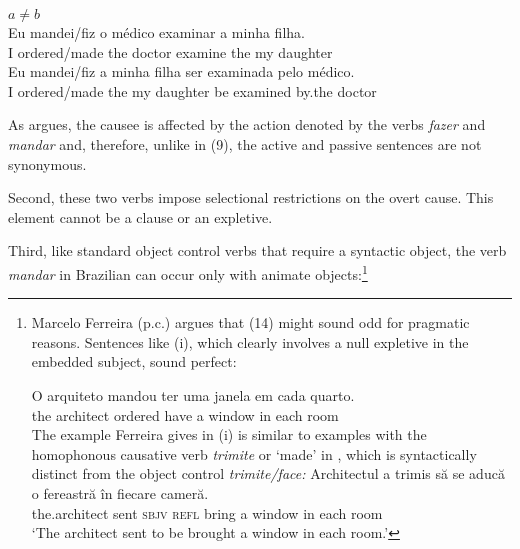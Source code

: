 \documentclass[output=paper]{langsci/langscibook}
\begin{document}
\ea%
           $a \neq b$\label{ex:moreno:10}\\
    \ea
    \gll Eu   mandei/fiz      o    médico   examinar  a    minha filha.\\
         I         ordered/made the doctor     examine    the my     daughter\\
    \ex  
    \gll Eu   mandei/fiz    a     minha filha      ser examinada pelo    médico.\\
         I         ordered/made the  my      daughter  be examined    by.the doctor\\
    \z
\z    

As \citet{Farrell1995} argues, the causee is affected by the action denoted by the verbs \textit{fazer} and \textit{mandar} and, therefore, unlike in (9), the active and passive sentences are not synonymous.

Second, these two verbs impose selectional restrictions on the overt cause. This element cannot be a clause or an expletive. 

    \z



\z

Third, like standard object control verbs that require a syntactic object, the verb \textit{mandar} in Brazilian  can occur only with animate objects:\footnote{Marcelo Ferreira (p.c.) argues that (14) might sound odd for pragmatic reasons. Sentences like (i), which clearly involves a null expletive in the~ embedded subject, sound perfect:

\ea \gll  O   arquiteto mandou   ter    uma janela    em cada quarto.\\
the architect  ordered   have a      window in  each  room\\
\z The example Ferreira gives in (i) is similar to examples with the homophonous causative verb \textit{trimite} or ‘made’ in , which is syntactically distinct from the object control \textit{trimite\slash face:}
\ea \gll Architectul   {a trimis} să     se    aducă       o fereastră în fiecare cameră.\\
         the.architect sent       \textsc{sbjv} \textsc{refl} bring a window   in each room\\
    \glt ‘The architect sent to be brought a window in each room.’
\z}
\end{document}
